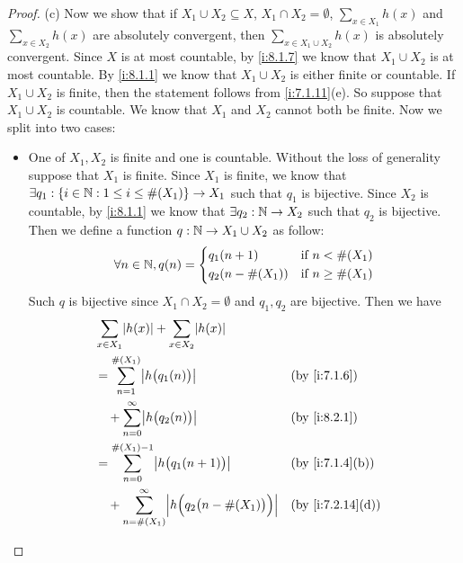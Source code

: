 \begin{proof}{(c)}
  Now we show that if \(X_1 \cup X_2 \subseteq X\), \(X_1 \cap X_2 = \emptyset\), \(\sum_{x \in X_1} h(x)\) and \(\sum_{x \in X_2} h(x)\) are absolutely convergent, then \(\sum_{x \in X_1 \cup X_2} h(x)\) is absolutely convergent.
  Since \(X\) is at most countable, by \cref{i:8.1.7} we know that \(X_1 \cup X_2\) is at most countable.
  By \cref{i:8.1.1} we know that \(X_1 \cup X_2\) is either finite or countable.
  If \(X_1 \cup X_2\) is finite, then the statement follows from \cref{i:7.1.11}(e).
  So suppose that \(X_1 \cup X_2\) is countable.
  We know that \(X_1\) and \(X_2\) cannot both be finite.
  Now we split into two cases:
  \begin{itemize}
    \item One of \(X_1, X_2\) is finite and one is countable.
          Without the loss of generality suppose that \(X_1\) is finite.
          Since \(X_1\) is finite, we know that \(\exists q_1 : \left\lbrace i \in \mathbb{N} : 1 \leq i \leq \#(X_1)\right\rbrace \to X_1\) such that \(q_1\) is bijective.
          Since \(X_2\) is countable, by \cref{i:8.1.1} we know that \(\exists q_2 : \mathbb{N} \to X_2\) such that \(q_2\) is bijective.
          Then we define a function \(q : \mathbb{N} \to X_1 \cup X_2\) as follow:
          \[
            \forall n \in \mathbb{N}, q(n) = \begin{dcases}
              q_1(n + 1)       & \text{if } n < \#(X_1)    \\
              q_2(n - \#(X_1)) & \text{if } n \geq \#(X_1)
            \end{dcases}
          \]
          Such \(q\) is bijective since \(X_1 \cap X_2 = \emptyset\) and \(q_1, q_2\) are bijective.
          Then we have
          \begin{align*}
             & \sum_{x \in X_1} \abs{h(x)} + \sum_{x \in X_2} \abs{h(x)}                                                                  \\
             & = \sum_{n = 1}^{\#(X_1)} \abs{h\big(q_1(n)\big)}                                                     &  & \by{i:7.1.6}     \\
             & \quad + \sum_{n = 0}^\infty \abs{h\big(q_2(n)\big)}                                                  &  & \by{i:8.2.1}     \\
             & = \sum_{n = 0}^{\#(X_1) - 1} \abs{h\big(q_1(n + 1)\big)}                                             &  & \by{i:7.1.4}[b]  \\
             & \quad + \sum_{n = \#(X_1)}^\infty \abs{h\Big(q_2\big(n - \#(X_1)\big)\Big)}                          &  & \by{i:7.2.14}[d] \\

\end{align*}
\end{itemize}
\end{proof}
